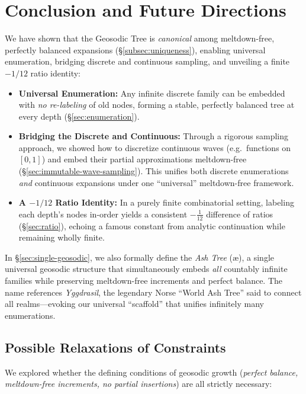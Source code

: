 \section{Conclusion and Future Directions}
\label{sec:conclusion}

We have shown that the Geosodic Tree is \emph{canonical} among meltdown-free,
perfectly balanced expansions (\S\ref{subsec:uniqueness}), enabling universal
enumeration, bridging discrete and continuous sampling, and unveiling a finite
$-1/12$ ratio identity:

\begin{itemize}
  \item \textbf{Universal Enumeration:}
    Any infinite discrete family can be embedded with \emph{no re-labeling} of old nodes,
    forming a stable, perfectly balanced tree at every depth (\S\ref{sec:enumeration}).

  \item \textbf{Bridging the Discrete and Continuous:}
    Through a rigorous sampling approach, we showed how to discretize continuous waves
    (e.g.\ functions on $[0,1]$) and embed their partial approximations meltdown-free
    (\S\ref{sec:immutable-wave-sampling}). This unifies both discrete enumerations
    \emph{and} continuous expansions under one “universal” meltdown-free framework.

  \item \textbf{A $-1/12$ Ratio Identity:}
    In a purely finite combinatorial setting, labeling each depth’s nodes
    in-order yields a consistent $-\tfrac{1}{12}$ difference of ratios
    (\S\ref{sec:ratio}), echoing a famous constant from analytic continuation
    while remaining wholly finite.
\end{itemize}

In \S\ref{sec:single-geosodic}, we also formally define the \emph{Ash Tree} (\ae),
a single universal geosodic structure that simultaneously embeds
\emph{all} countably infinite families while preserving meltdown-free increments
and perfect balance.  The name references \emph{Yggdrasil}, the legendary Norse
“World Ash Tree” said to connect all realms—evoking our universal “scaffold”
that unifies infinitely many enumerations.

\subsection*{Possible Relaxations of Constraints}
We explored whether the defining conditions of geosodic growth
(\emph{perfect balance, meltdown-free increments, no partial insertions})
are all strictly necessary:

